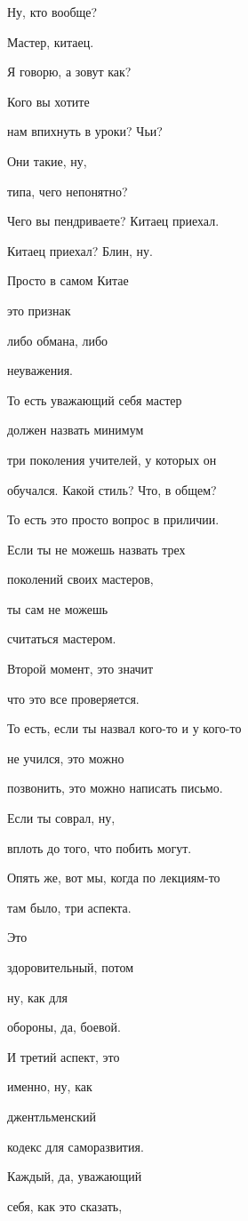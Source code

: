 Ну, кто вообще?

Мастер, китаец.

Я говорю, а зовут как?

Кого вы хотите

нам впихнуть в уроки? Чьи?

Они такие, ну,

типа, чего непонятно?

Чего вы пендриваете? Китаец приехал.

Китаец приехал? Блин, ну.

Просто в самом Китае

это признак

либо обмана, либо

неуважения.

То есть уважающий себя мастер

должен назвать минимум

три поколения учителей, у которых он

обучался. Какой стиль? Что, в общем?

То есть это просто вопрос в приличии.

Если ты не можешь назвать трех

поколений своих мастеров,

ты сам не можешь

считаться мастером.

Второй момент, это значит

что это все проверяется.

То есть, если ты назвал кого-то и у кого-то

не учился, это можно

позвонить, это можно написать письмо.

Если ты соврал, ну,

вплоть до того, что побить могут.

Опять же, вот мы, когда по лекциям-то

там было, три аспекта.

Это

здоровительный, потом

ну, как для

обороны, да, боевой.

И третий аспект, это

именно, ну, как

джентльменский

кодекс для саморазвития.

Каждый, да, уважающий

себя, как это сказать,

